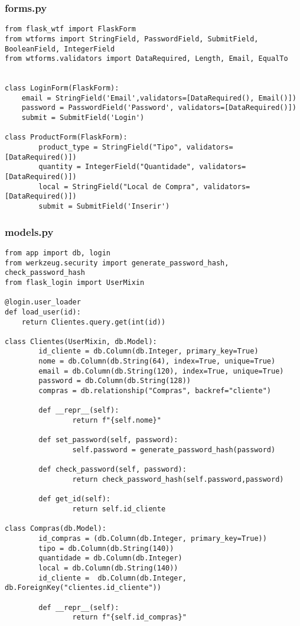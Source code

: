 \documentclass{report}
\begin{document}
\subsubsection{forms.py}
\begin{lstlisting}
from flask_wtf import FlaskForm
from wtforms import StringField, PasswordField, SubmitField, BooleanField, IntegerField
from wtforms.validators import DataRequired, Length, Email, EqualTo


class LoginForm(FlaskForm):
    email = StringField('Email',validators=[DataRequired(), Email()])
    password = PasswordField('Password', validators=[DataRequired()])
    submit = SubmitField('Login')

class ProductForm(FlaskForm):
        product_type = StringField("Tipo", validators=[DataRequired()])
        quantity = IntegerField("Quantidade", validators=[DataRequired()])
        local = StringField("Local de Compra", validators=[DataRequired()])
        submit = SubmitField('Inserir')
\end{lstlisting}


\subsubsection{models.py}
\begin{lstlisting}
from app import db, login
from werkzeug.security import generate_password_hash, check_password_hash
from flask_login import UserMixin

@login.user_loader
def load_user(id):
    return Clientes.query.get(int(id))

class Clientes(UserMixin, db.Model):
        id_cliente = db.Column(db.Integer, primary_key=True)
        nome = db.Column(db.String(64), index=True, unique=True)
        email = db.Column(db.String(120), index=True, unique=True)
        password = db.Column(db.String(128))
        compras = db.relationship("Compras", backref="cliente")

        def __repr__(self):
                return f"{self.nome}"

        def set_password(self, password):
                self.password = generate_password_hash(password)

        def check_password(self, password):
                return check_password_hash(self.password,password)

        def get_id(self):
                return self.id_cliente

class Compras(db.Model):
        id_compras = (db.Column(db.Integer, primary_key=True))
        tipo = db.Column(db.String(140))
        quantidade = db.Column(db.Integer)
        local = db.Column(db.String(140))
        id_cliente =  db.Column(db.Integer, db.ForeignKey("clientes.id_cliente"))

        def __repr__(self):
                return f"{self.id_compras}"
\end{lstlisting}
\end{document}
